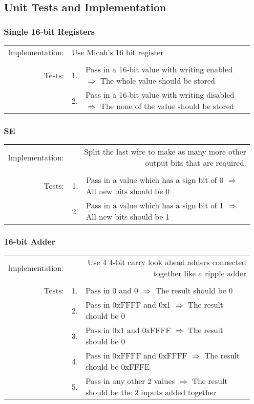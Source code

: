 	\subsection{Unit Tests and Implementation}
		\subsubsection{Single 16-bit Registers}
			\begin{tabular}{ r  r  p{12cm} }
				Implementation: & \multicolumn{2}{l}{Use Micah's 16 bit register}\\
				                &    & \\
				         Tests: & 1. & Pass in a 16-bit value with writing enabled $\Rightarrow$ The whole value should be stored\\
				                & 2. & Pass in a 16-bit value with writing disabled $\Rightarrow$ The none of the value should be stored\\
			\end{tabular}
		\subsubsection{SE}
			\begin{tabular}{ r  r  p{12cm} }
				Implementation: & \multicolumn{2}{p{12.75cm}}{Split the last wire to make as many more other output bits that are required.}\\
				                &    & \\
				         Tests: & 1. & Pass in a value which has a sign bit of 0 $\Rightarrow$ All new bits should be 0\\
				                & 2. & Pass in a value which has a sign bit of 1 $\Rightarrow$ All new bits should be 1\\
			\end{tabular}
		\subsubsection{16-bit Adder}
			\begin{tabular}{ r  r  p{12cm} }
				Implementation: & \multicolumn{2}{p{12.75cm}}{Use 4 4-bit carry look ahead adders connected together like a ripple adder}\\
				                &    & \\
				         Tests: & 1. & Pass in 0 and 0 $\Rightarrow$ The result should be 0\\
				                & 2. & Pass in 0xFFFF and 0x1 $\Rightarrow$ The result should be 0\\
				                & 3. & Pass in 0x1 and 0xFFFF $\Rightarrow$ The result should be 0\\
				                & 4. & Pass in 0xFFFF and 0xFFFF $\Rightarrow$ The result should be 0xFFFE\\
				                & 5. & Pass in any other 2 values $\Rightarrow$ The result should be the 2 inputs added together\\
			\end{tabular}
